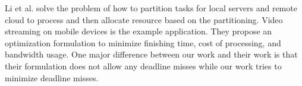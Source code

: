 Li et al. \cite{energya} solve the problem of how to partition tasks for local servers and remote cloud to process and then allocate resource based on the partitioning. Video streaming on mobile devices is the example application. They propose an optimization formulation to minimize finishing time, cost of processing, and bandwidth usage. One major difference between our work and their work is that their formulation does not allow any deadline misses while our work tries to minimize deadline misses.




\fi








